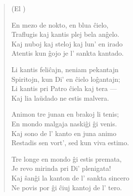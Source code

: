 \begin{verse}
\begin{center}
\footnotesize (El )
\end{center}
                  En mezo de nokto, en blua \^cielo,\\
                  Traflugis kaj kantis plej bela an\^gelo.\\
                  Kaj nuboj kaj steloj kaj lun' en irado\\
                  Atentis kun \^gojo je l' sankta kantado.

                  Li kantis feli\^cajn, neniam pekantajn\\
                  Spiritojn, kun Di' en \^cielo lo\^gantajn;\\
                  Li kantis pri Patro \^ciela kaj tera ---\\
                  Kaj lia la\u udado ne estis malvera.

                  Animon tre junan en brakoj li tenis;\\
                  En mondo malgaja naski\^gi \^gi venis.\\
                  Kaj sono de l' kanto en juna animo\\
                  Restadis sen vort', sed kun viva estimo.

                  Tre longe en mondo \^gi estis premata,\\
                  Je revo mirinda pri Di' plenigata!\\
                  Kaj \^san\^gi la kanton de l' sankta sincero\\
                  Ne povis por \^gi \^ciuj kantoj de l' tero.

\end{verse}


\smallrule{}